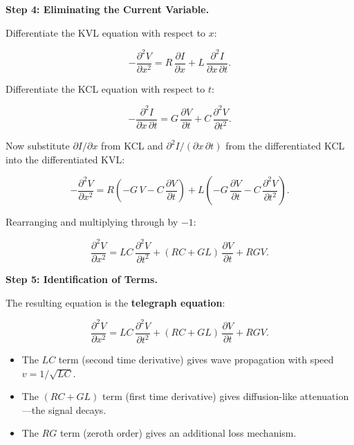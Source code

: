 \textbf{Step 4: Eliminating the Current Variable.}

Differentiate the KVL equation with respect to $x$:

\begin{equation}
-\frac{\partial^2 V}{\partial x^2} = R\,\frac{\partial I}{\partial x} + L\,\frac{\partial^2 I}{\partial x\,\partial t}.
\end{equation}

Differentiate the KCL equation with respect to $t$:

\begin{equation}
-\frac{\partial^2 I}{\partial x\,\partial t} = G\,\frac{\partial V}{\partial t} + C\,\frac{\partial^2 V}{\partial t^2}.
\end{equation}

Now substitute $\partial I/\partial x$ from KCL and $\partial^2 I / (\partial x\,\partial t)$ from the differentiated KCL into the differentiated KVL:

\begin{equation}
-\frac{\partial^2 V}{\partial x^2} = R\left(-G\,V - C\,\frac{\partial V}{\partial t}\right) + L\left(-G\,\frac{\partial V}{\partial t} - C\,\frac{\partial^2 V}{\partial t^2}\right).
\end{equation}

Rearranging and multiplying through by $-1$:

\begin{equation}
\frac{\partial^2 V}{\partial x^2} = LC\,\frac{\partial^2 V}{\partial t^2} + (RC + GL)\,\frac{\partial V}{\partial t} + RGV.
\end{equation}

\textbf{Step 5: Identification of Terms.}

The resulting equation is the \textbf{telegraph equation}:

\begin{equation}
\boxed{\frac{\partial^2 V}{\partial x^2} = LC\,\frac{\partial^2 V}{\partial t^2} + (RC + GL)\,\frac{\partial V}{\partial t} + RGV.}
\end{equation}

\begin{itemize}
\item The $LC$ term (second time derivative) gives wave propagation with speed $v = 1/\sqrt{LC}$.
\item The $(RC + GL)$ term (first time derivative) gives diffusion-like attenuation---the signal decays.
\item The $RG$ term (zeroth order) gives an additional loss mechanism.
\end{itemize}

